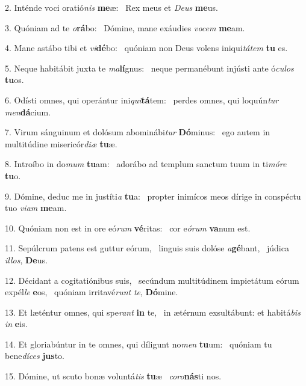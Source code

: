 2. Inténde voci oratió\textit{nis} \textbf{me}æ: \ast\  Rex meus et \textit{De}\textit{us} \textbf{me}us.\

3. Quóniam ad te \textit{o}\textbf{rá}bo: \ast\  Dómine, mane exáudies \textit{vo}\textit{cem} \textbf{me}am.\

4. Mane astábo tibi et \textit{vi}\textbf{dé}bo: \ast\  quóniam non Deus volens iniqui\textit{tá}\textit{tem} \textbf{tu} es.\

5. Neque habitábit juxta te \textit{ma}\textbf{lí}gnus: \ast\  neque permanébunt injústi ante ó\textit{cu}\textit{los} \textbf{tu}os.\

6. Odísti omnes, qui operántur ini\textit{qui}\textbf{tá}tem: \ast\  perdes omnes, qui loquún\textit{tur} \textit{men}\textbf{dá}cium.\

7. Virum sánguinum et dolósum abominábi\textit{tur} \textbf{Dó}minus: \ast\  ego autem in multitúdine misericór\textit{di}\textit{æ} \textbf{tu}æ.\

8. Introíbo in do\textit{mum} \textbf{tu}am: \ast\  adorábo ad templum sanctum tuum in ti\textit{mó}\textit{re} \textbf{tu}o.\

9. Dómine, deduc me in justíti\textit{a} \textbf{tu}a: \ast\  propter inimícos meos dírige in conspéctu tuo \textit{vi}\textit{am} \textbf{me}am.\

10. Quóniam non est in ore eó\textit{rum} \textbf{vé}ritas: \ast\  cor e\textit{ó}\textit{rum} \textbf{va}num est.\

11. Sepúlcrum patens est guttur eórum, \dag\  linguis suis dolóse \textit{a}\textbf{gé}bant, \ast\  júdica \textit{il}\textit{los}, \textbf{De}us.\

12. Décidant a cogitatiónibus suis, \dag\  secúndum multitúdinem impietátum eórum expél\textit{le} \textbf{e}os, \ast\  quóniam irritavé\textit{runt} \textit{te}, \textbf{Dó}mine.\

13. Et læténtur omnes, qui spe\textit{rant} \textbf{in} te, \ast\  in ætérnum exsultábunt: et habitá\textit{bis} \textit{in} \textbf{e}is.\

14. Et gloriabúntur in te omnes, qui díligunt no\textit{men} \textbf{tu}um: \ast\  quóniam tu bene\textit{dí}\textit{ces} \textbf{jus}to.\

15. Dómine, ut scuto bonæ voluntá\textit{tis} \textbf{tu}æ \ast\  \textit{co}\textit{ro}\textbf{nás}ti nos.\

